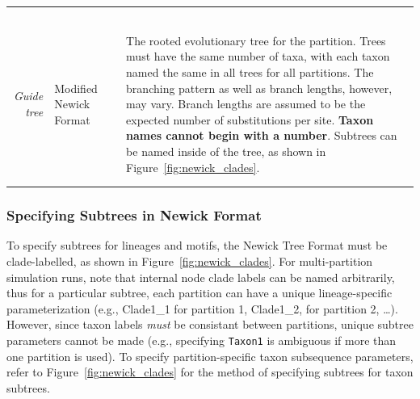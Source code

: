 \documentclass[10pt]{article}
\begin{document}
\begin{small}
\begin{ThreePartTable}
\begin{longtable}{p{2cm}p{5.5cm}p{0.8cm}p{7cm}}
{$$ }\\ 
\\ 
 \multicolumn{1}{r}{\it Guide tree}          & Modified Newick Format && The rooted evolutionary tree for the partition. Trees must have the same number of taxa, with each taxon named the same in all trees for all partitions. The branching pattern as well as branch lengths, however, may vary. Branch lengths are assumed to be the expected number of substitutions per site. {\bf Taxon names cannot begin with a number}. Subtrees can be named inside of the tree, as shown in Figure~\ref{fig:newick_clades}.\\ \\
\hline 
\label{tab:options}
\end{longtable}
\end{ThreePartTable}
\end{small}

 \subsubsection{Specifying Subtrees in Newick Format}

 To specify subtrees for lineages and motifs, the Newick Tree Format must be clade-labelled, as shown in Figure~\ref{fig:newick_clades}. For multi-partition simulation runs, note that internal node clade labels can be named arbitrarily, thus for a particular subtree, each partition can have a unique lineage-specific parameterization (e.g., Clade1\_1 for partition 1, Clade1\_2, for partition 2, \ldots). However, since taxon labels \emph{must} be consistant between partitions, unique subtree parameters cannot be made (e.g., specifying {\tt Taxon1} is ambiguous if more than one partition is used). To specify partition-specific taxon subsequence parameters, refer to Figure~\ref{fig:newick_clades} for the method of specifying subtrees for taxon subtrees.
 
\end{document}
